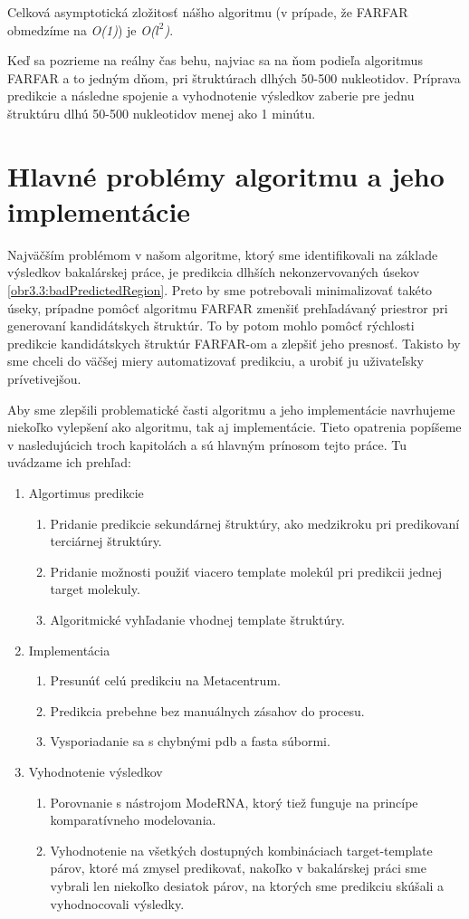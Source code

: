Celková asymptotická zložitosť nášho algoritmu (v prípade, že FARFAR obmedzíme na \textit{O(1)}) je  \textit{O($l^2$)}. 

\indent Keď sa pozrieme na reálny čas behu, najviac sa na ňom podieľa algoritmus FARFAR a to jedným  dňom, pri štruktúrach dlhých 50-500 nukleotidov. Príprava predikcie a následne spojenie a vyhodnotenie výsledkov zaberie pre jednu štruktúru dlhú 50-500 nukleotidov menej ako 1 minútu.


\section{Hlavné problémy algoritmu a jeho implementácie}
Najväčším problémom v našom algoritme, ktorý sme identifikovali na základe výsledkov bakalárskej práce, je predikcia dlhších nekonzervovaných úsekov \autoref{obr3.3:badPredictedRegion}. Preto by sme potrebovali minimalizovať takéto úseky, prípadne pomôcť algoritmu FARFAR zmenšiť prehľadávaný priestror pri generovaní kandidátskych štruktúr. To by potom mohlo pomôcť rýchlosti predikcie kandidátskych štruktúr FARFAR-om a zlepšiť jeho presnosť. Takisto by sme chceli do väčšej miery automatizovať predikciu, a urobiť ju uživateľsky prívetivejšou.

\indent Aby sme zlepšili problematické časti algoritmu a jeho implementácie navrhujeme niekoľko vylepšení ako algoritmu, tak aj implementácie. Tieto opatrenia popíšeme v nasledujúcich troch kapitolách a sú hlavným prínosom tejto práce. Tu uvádzame ich prehľad:
\begin{enumerate}
\item Algortimus predikcie
\begin{enumerate}
\item Pridanie predikcie sekundárnej štruktúry, ako medzikroku pri predikovaní terciárnej štruktúry.
\item Pridanie možnosti použiť viacero template molekúl pri predikcii jednej target molekuly.
\item Algoritmické vyhľadanie vhodnej template štruktúry.
\end{enumerate}
\item Implementácia
\begin{enumerate}
\item Presunúť celú predikciu na Metacentrum.
\item Predikcia prebehne bez manuálnych zásahov do procesu.
\item Vysporiadanie sa s chybnými pdb a fasta súbormi.
\end{enumerate}
\item Vyhodnotenie výsledkov
\begin{enumerate}
\item Porovnanie s nástrojom ModeRNA, ktorý tiež funguje na princípe komparatívneho modelovania.
\item Vyhodnotenie na všetkých dostupných kombináciach target-template párov, ktoré má zmysel predikovať, nakoľko v bakalárskej práci sme vybrali len niekoľko desiatok párov, na ktorých sme predikciu skúšali a vyhodnocovali výsledky.
\end{enumerate}
\end{enumerate}


